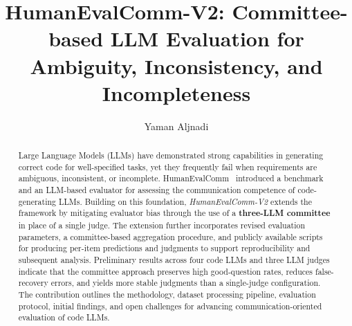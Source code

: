 \documentclass[acmsmall,screen,nonacm]{acmart}
\title{HumanEvalComm-V2: Committee-based LLM Evaluation for Ambiguity, Inconsistency, and Incompleteness}
\author{Yaman Aljnadi}
\affiliation{%
  \institution{Michigan Technological University}
}
\begin{document}

\begin{abstract}
Large Language Models (LLMs) have demonstrated strong capabilities in generating correct code for well-specified tasks, yet they frequently fail when requirements are ambiguous, inconsistent, or incomplete. HumanEvalComm~\cite{WuFard2025HumanEvalComm} introduced a benchmark and an LLM-based evaluator for assessing the communication competence of code-generating LLMs. Building on this foundation, \emph{HumanEvalComm-V2} extends the framework by mitigating evaluator bias through the use of a \textbf{three-LLM committee} in place of a single judge. The extension further incorporates revised evaluation parameters, a committee-based aggregation procedure, and publicly available scripts for producing per-item predictions and judgments to support reproducibility and subsequent analysis. Preliminary results across four code LLMs and three LLM judges indicate that the committee approach preserves high good-question rates, reduces false-recovery errors, and yields more stable judgments than a single-judge configuration. The contribution outlines the methodology, dataset processing pipeline, evaluation protocol, initial findings, and open challenges for advancing communication-oriented evaluation of code LLMs.
\end{abstract}

\maketitle
\setlength{\headheight}{5pt}
\addtolength{\topmargin}{-10pt}
\addtolength{\textheight}{10pt}
\pagestyle{plain}
\end{document}
